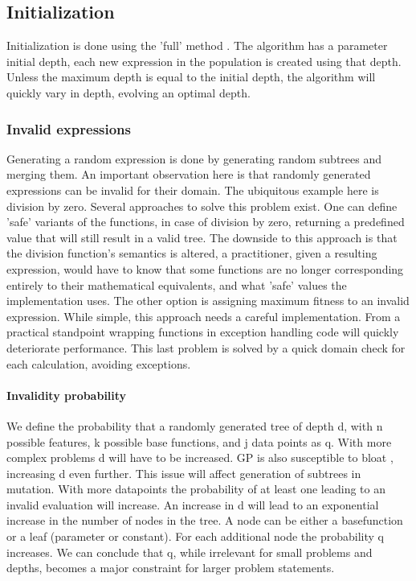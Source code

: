 \subsection{Initialization}
Initialization is done using the 'full' method \cite{GP}. The algorithm has a parameter initial depth, each new expression in the population is created using that depth. Unless the maximum depth is equal to the initial depth, the algorithm will quickly vary in depth, evolving an optimal depth. 
 
\subsubsection{Invalid expressions}\label{subsubinvalidexpressions}
Generating a random expression is done by generating random subtrees and merging them. An important observation here is that randomly generated expressions can be invalid for their domain. The ubiquitous example here is division by zero. Several approaches to solve this problem exist. One can define 'safe' variants of the functions, in case of division by zero, returning a predefined value that will still result in a valid tree. The downside to this approach is that the division function's semantics is altered, a practitioner, given a resulting expression, would have to know that some functions are no longer corresponding entirely to their mathematical equivalents, and what 'safe' values the implementation uses.
The other option is assigning maximum fitness to an invalid expression. While simple, this approach needs a careful implementation. From a practical standpoint wrapping functions in exception handling code will quickly deteriorate performance. 
This last problem is solved by a quick domain check for each calculation, avoiding exceptions. 

\paragraph{Invalidity probability}
We define the probability that a randomly generated tree of depth d, with n possible features, k possible base functions, and j data points as q. With more complex problems d will have to be increased. GP is also susceptible to bloat \cite{GPBloat}, increasing d even further. This issue will affect generation of subtrees in mutation. With more datapoints the probability of at least one leading to an invalid evaluation will increase. An increase in d will lead to an exponential increase in the number of nodes in the tree. A node can be either a basefunction or a leaf (parameter or constant). For each additional node the probability q increases. We can conclude that q, while irrelevant for small problems and depths, becomes a major constraint for larger problem statements. 

